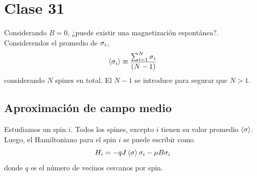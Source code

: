 \section{Clase 31}
Considerando $B=0$, ¿puede existir una magnetización espontánea?. Considerendos el promedio de $\sigma_i$,
\begin{equation}
  \ev{\s_i}\equiv \frac{\sum_{i=1}^N\s_i}{(N-1)}
\end{equation}
considerando $N$ spines en total. El $N-1$ se introduce para segurar que $N>1$.

\subsection{Aproximación de campo medio}
Estudiamos un spin $i$. Todos los spines, excepto $i$ tienen su valor promedio $\ev{\s}$. Luego, el Hamiltoniano para el spin $i$ se puede escribir como
\begin{equation}
  H_i=-qJ\ev{\s }\s_i-\m B\s_i
\end{equation}
donde $q$ es el número de vecinos cercanos por spin.

